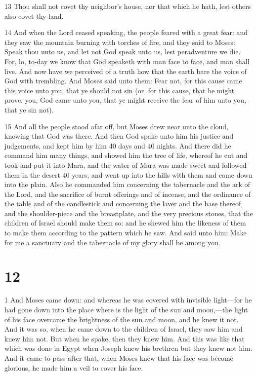 \par 13 Thou shall not covet thy neighbor's house, nor that which he hath, lest others also covet thy land.

\par 14 And when the Lord ceased speaking, the people feared with a great fear: and they saw the mountain burning with torches of fire, and they said to Moses: Speak thou unto us, and let not God speak unto us, lest peradventure we die. For, lo, to-day we know that God speaketh with man face to face, and man shall live. And now have we perceived of a truth how that the earth bare the voice of God with trembling. And Moses said unto them: Fear not, for this cause came this voice unto you, that ye should not sin (or, for this cause, that he might prove. you, God came unto you, that ye might receive the fear of him unto you, that ye sin not). 

\par 15 And all the people stood afar off, but Moses drew near unto the cloud, knowing that God was there. And then God spake unto him his justice and judgements, and kept him by him 40 days and 40 nights. And there did he command him many things, and showed him the tree of life, whereof he cut and took and put it into Mara, and the water of Mara was made sweet and followed them in the desert 40 years, and went up into the hills with them and came down into the plain. Also he commanded him concerning the tabernacle and the ark of the Lord, and the sacrifice of burnt offerings and of incense, and the ordinance of the table and of the candlestick and concerning the laver and the base thereof, and the shoulder-piece and the breastplate, and the very precious stones, that the children of Israel should make them so: and he shewed him the likeness of them to make them according to the pattern which he saw. And said unto him: Make for me a sanctuary and the tabernacle of my glory shall be among you.

\chapter{12}

\par 1 And Moses came down: and whereas he was covered with invisible light—for he had gone down into the place where is the light of the sun and moon,—the light of his face overcame the brightness of the sun and moon, and he knew it not. And it was so, when he came down to the children of Israel, they saw him and knew him not. But when he spake, then they knew him. And this was like that which was done in Egypt when Joseph knew his brethren but they knew not him. And it came to pass after that, when Moses knew that his face was become glorious, he made him a veil to cover his face.

